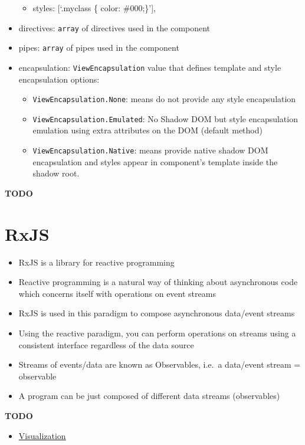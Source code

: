 \documentclass[12pt,]{article}
\providecommand{\tightlist}{%
  \setlength{\itemsep}{0pt}\setlength{\parskip}{0pt}}
\begin{document}
\begin{itemize}
  \begin{itemize}
  \tightlist
  \item
    styles: {[}`.myclass \{ color: \#000;\}'{]},
  \end{itemize}
\item
  directives: \texttt{array} of directives used in the component
\item
  pipes: \texttt{array} of pipes used in the component
\item
  encapsulation: \texttt{ViewEncapsulation} value that defines template
  and style encapsulation options:

  \begin{itemize}
  \tightlist
  \item
    \texttt{ViewEncapsulation.None}: means do not provide any style
    encapsulation
  \item
    \texttt{ViewEncapsulation.Emulated}: No Shadow DOM but style
    encapsulation emulation using extra attributes on the DOM (default
    method)
  \item
    \texttt{ViewEncapsulation.Native}: means provide native shadow DOM
    encapsulation and styles appear in component's template inside the
    shadow root.
  \end{itemize}
\end{itemize}

\textbf{TODO}

\section{RxJS}\label{rxjs}

\begin{itemize}
\tightlist
\item
  RxJS is a library for reactive programming
\item
  Reactive programming is a natural way of thinking about asynchronous
  code which concerns itself with operations on event streams
\item
  RxJS is used in this paradigm to compose asynchronous data/event
  streams
\item
  Using the reactive paradigm, you can perform operations on streams
  using a consistent interface regardless of the data source
\item
  Streams of events/data are known as Observables, i.e.~a data/event
  stream = observable
\item
  A program can be just composed of different data streams (observables)
\end{itemize}

\textbf{TODO}

\begin{itemize}
\tightlist
\item
  \href{http://rxmarbles.com/}{Visualization}
\end{itemize}
\end{document}
